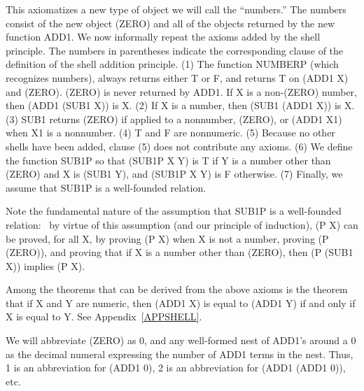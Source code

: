 \documentclass[10pt]{book}
\begin{document}
\hrulefill 

This  axiomatizes 
a new type of object we will call the ``numbers.''
The numbers consist of the new object (ZERO) and all of the
objects returned by the new function ADD1.
We now informally repeat the axioms added by the shell principle.
The numbers in parentheses indicate the corresponding clause
of the definition of the shell addition principle.
(1) The function NUMBERP
(which recognizes numbers), always returns either T or F, and returns T on 
(ADD1 X) and (ZERO).  (ZERO) is never
returned by ADD1.  If X is a non-(ZERO) number, then (ADD1 (SUB1 X))
is X.  (2) If X is a number, then (SUB1 (ADD1 X)) is X.  (3) SUB1 returns (ZERO)
if applied to a nonnumber, (ZERO), or (ADD1 X1) when X1 is a nonnumber.
(4) T and F are nonnumeric.  (5) Because no other shells have been
added, clause (5) does not contribute any axioms.
(6) We define the function SUB1P so that (SUB1P X Y) is T if
Y is a number other than (ZERO) and X is  (SUB1 Y), and (SUB1P X Y)
is F otherwise.  (7) Finally, we assume that SUB1P is a well-founded relation.

Note the fundamental nature of the assumption that SUB1P is a well-founded relation:~
by virtue of this assumption (and our principle of
induction), (P X) can be proved, for all X, by proving (P X)
when X is not a number, proving (P (ZERO)), and proving that if X is
a number other than (ZERO), then (P (SUB1 X)) implies (P X).

Among the theorems that can be derived from the above axioms is
the theorem that if X and Y are numeric, then (ADD1 X) is equal to (ADD1 Y)
if and only if X is equal to Y.  See Appendix~\ref{APPSHELL}.

We will abbreviate (ZERO) as 0, and any well-formed nest of ADD1's around a
0 as the decimal numeral expressing the number of ADD1 terms in the nest.
Thus, 1 is an abbreviation for (ADD1 0), 2 is an abbreviation
for (ADD1 (ADD1 0)), etc.
\end{document}
